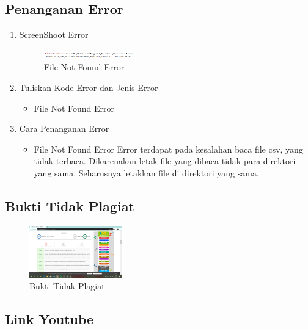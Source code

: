 \subsection{Penanganan Error}
\begin{enumerate}
\item ScreenShoot Error
	\begin{figure}[H]
		\includegraphics[width=4cm]{figures/1174054/3/error1.png}
		\centering
		\caption{File Not Found Error}
	\end{figure}

	\item Tuliskan Kode Error dan Jenis Error
	\begin{itemize}
		\item File Not Found Error

	\end{itemize}
	\item Cara Penanganan Error
	\begin{itemize}
		\item File Not Found Error
		\hfill\break
		Error terdapat pada kesalahan baca file csv, yang tidak terbaca. Dikarenakan letak file yang dibaca tidak para direktori yang sama. Seharusnya letakkan file di direktori yang sama. 
	\end{itemize}
\end{enumerate}

\subsection{Bukti Tidak Plagiat}
\begin{figure}[H]
	\includegraphics[width=4cm]{figures/1174054/3/plagiarisme.png}
	\centering
	\caption{Bukti Tidak Plagiat}
\end{figure}

\subsection{Link Youtube}
